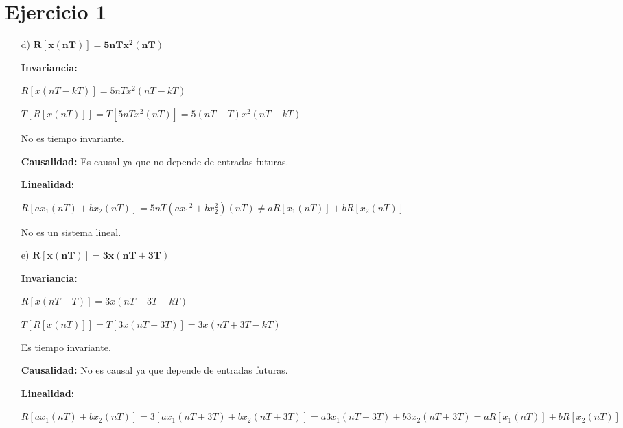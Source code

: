 








\section*{Ejercicio 1}
\begin{itemize}
	\item[d)] $\mathbf{R \left[ x \left( nT \right) \right] = 5nT x^2 \left( nT \right)}$ 
	
		\textbf{Invariancia:}
		
		$R \left[ x \left( nT - kT \right) \right] = 5nT x^2 \left( nT - kT \right)$ 
		
		$T \left[ R \left[ x \left( nT \right) \right] \right] = T \left[ 5nT x^2 \left( nT \right) \right] = 5(nT-T) x^2 \left( nT - kT \right)$ 
		
		No es tiempo invariante.
		
		\textbf{Causalidad:} Es causal ya que no depende de entradas futuras.
		
		\textbf{Linealidad:}
		
		 $R \left[ ax_1 \left( nT \right) + bx_2 \left( nT \right) \right] = 5nT \left(a{x_{1}}^{2} + b {x_{2}^{2}}\right) \left( nT \right) \neq aR \left[ x_1 \left( nT \right) \right] + bR \left[ x_2 \left( nT \right) \right]$

		No es un sistema lineal.
		
	\item[e)] $\mathbf{R \left[ x \left( nT \right) \right] = 3x \left( nT + 3T\right)}$ 
	
		\textbf{Invariancia:}
		
		$R \left[ x \left( nT - T \right) \right] = 3x \left( nT + 3T - kT \right)$ 
		
		$T \left[ R \left[ x \left( nT \right) \right] \right] = T \left[ 3x \left( nT + 3T \right) \right] = 3x \left( nT + 3T - kT \right)$ 
		
		Es tiempo invariante.
		
		\textbf{Causalidad:} No es causal ya que depende de entradas futuras.
		
		\textbf{Linealidad:}
		
		 $R \left[ ax_1 \left( nT \right) + bx_2 \left( nT \right) \right] = 3 \left[ ax_{1} \left( nT + 3T \right) + b x_{2} \left( nT + 3T \right) \right] = a 3 x_{1} \left( nT + 3T \right) + b 3x_{2} \left( nT + 3T \right) = aR \left[ x_1 \left( nT \right) \right] + bR \left[ x_2 \left( nT \right) \right]$


\end{itemize}
